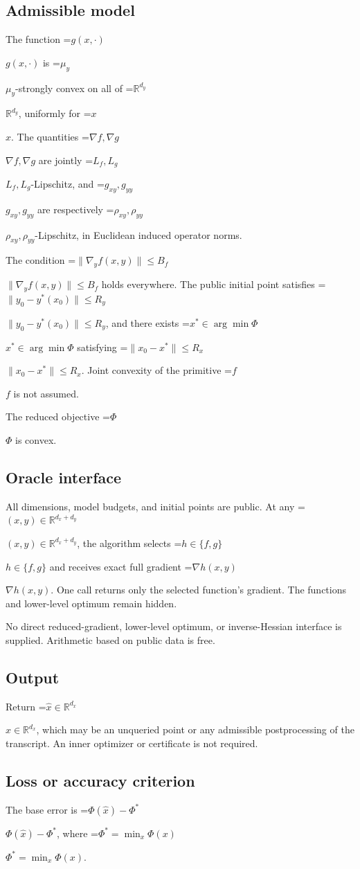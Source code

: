\documentclass[10pt,a4paper]{article}
\newcommand{\AtlasMath}[1]{\par\begingroup\centering\setbox0=\hbox{$\displaystyle #1$}\ifdim\wd0>1.4\linewidth\typeout{ATLAS WIDE FORMULA: \the\wd0}\fi\ifdim\wd0>\linewidth\resizebox{\linewidth}{!}{\box0}\else\box0\fi\par\endgroup}
\newcommand{\AtlasInlineMath}[1]{\begingroup\setbox0=\hbox{$#1$}\ifdim\wd0>.4\linewidth\endgroup\AtlasMath{#1}\else\endgroup$#1$\fi}
\begin{document}
\subsection{Admissible model}
The function \AtlasInlineMath{g(x,\cdot)} is \AtlasInlineMath{\mu_y}-strongly convex on all of \AtlasInlineMath{\mathbb{R}^{d_y}}, uniformly for \AtlasInlineMath{x}. The quantities \AtlasInlineMath{\nabla f,\nabla g} are jointly \AtlasInlineMath{L_f,L_g}-Lipschitz, and \AtlasInlineMath{g_{xy},g_{yy}} are respectively \AtlasInlineMath{\rho_{xy},\rho_{yy}}-Lipschitz, in Euclidean induced operator norms.

The condition \AtlasInlineMath{\|\nabla_y f(x,y)\|\le B_f} holds everywhere. The public initial point satisfies \AtlasInlineMath{\|y_0-y^*(x_0)\|\le R_y}, and there exists \AtlasInlineMath{x^*\in\arg\min\Phi} satisfying \AtlasInlineMath{\|x_0-x^*\|\le R_x}. Joint convexity of the primitive \AtlasInlineMath{f} is not assumed.

The reduced objective \AtlasInlineMath{\Phi} is convex.

\subsection{Oracle interface}
All dimensions, model budgets, and initial points are public. At any \AtlasInlineMath{(x,y)\in\mathbb{R}^{d_x+d_y}}, the algorithm selects \AtlasInlineMath{h\in\{f,g\}} and receives exact full gradient \AtlasInlineMath{\nabla h(x,y)}. One call returns only the selected function's gradient. The functions and lower-level optimum remain hidden.

No direct reduced-gradient, lower-level optimum, or inverse-Hessian interface is supplied. Arithmetic based on public data is free.

\subsection{Output}
Return \AtlasInlineMath{\widehat{x}\in\mathbb{R}^{d_x}}, which may be an unqueried point or any admissible postprocessing of the transcript. An inner optimizer or certificate is not required.

\subsection{Loss or accuracy criterion}
The base error is \AtlasInlineMath{\Phi(\widehat{x})-\Phi^*}, where \AtlasInlineMath{\Phi^*=\min_x\Phi(x)}.
\end{document}
